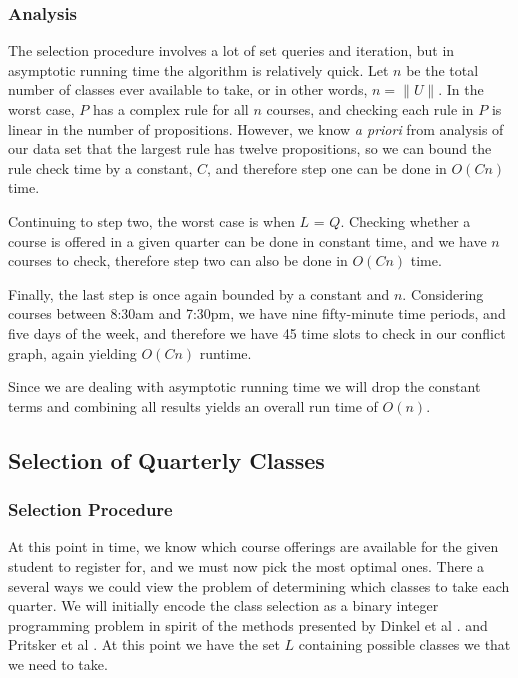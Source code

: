 \documentclass[11pt]{article} %
\begin{document}
\subsubsection{Analysis} The selection procedure involves a lot of set queries
and iteration, but in asymptotic running time the algorithm is relatively quick.
Let $n$ be the total number of classes ever available to take, or in other
words, $n = \|U\|$. In the worst case, $P$ has a complex rule for all $n$
courses, and checking each rule in $P$ is linear in the number of propositions.
However, we know {\it a priori} from analysis of our data set that the largest
rule has twelve propositions, so we can bound the rule check time by a constant,
$C$, and therefore step one can be done in $O(Cn)$ time.

Continuing to step two, the worst case is when $L$ = $Q$. Checking whether
a course is offered in a given quarter can be done in constant time, and we have
$n$ courses to check, therefore step two can also be done in $O(Cn)$ time.

Finally, the last step is once again bounded by a constant and $n$. Considering
courses between 8:30am and 7:30pm, we have nine fifty-minute time periods, and
five days of the week, and therefore we have 45 time slots to check in our
conflict graph, again yielding $O(Cn)$ runtime.

Since we are dealing with asymptotic running time we will drop the constant
terms and combining all results yields an overall run time of $O(n)$.

\subsection{Selection of Quarterly Classes} \subsubsection{Selection Procedure}
At this point in time, we know which course offerings are available for the
given student to register for, and we must now pick the most optimal ones. There
a several ways we could view the problem of determining which classes to take
each quarter. We will initially encode the class selection as a binary integer
programming problem in spirit of the methods presented by Dinkel et al
\cite{dinkel:scheduling}. and Pritsker et al \cite{prisker:informs}. At this
point we have the set $L$ containing possible classes we that we need to take.
\end{document}
